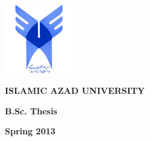\thispagestyle{empty}
\begin{center}
\begin{latin}
\vspace{-2cm}\centerline{{\includegraphics[height=3cm]{logo.png}}}
\Titles \textbf{ISLAMIC AZAD UNIVERSITY}\\
\par\vspace{17mm}
\textbf{B.Sc. Thesis}\\
\par\vspace{17mm}
\textbf{Spring 2013}
\end{latin}
\end {center}
\newpage
